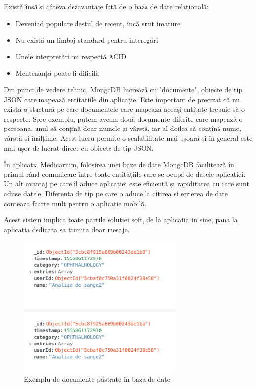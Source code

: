 \documentclass[12pt]{article}
\begin{document}
Există însă și câteva dezavantaje față de o baza de date relațională:
\begin{itemize}
    \item Devenind populare destul de recent, încă sunt imature
    \item Nu există un limbaj standard pentru interogări
    \item Unele interpretări nu respectă ACID
    \item Mentenanță poate fi dificilă
\end{itemize}


Din punct de vedere tehnic, MongoDB lucrează cu "documente", obiecte de tip JSON care 
mapează entitatiile din aplicație. Este important de precizat că nu există o stuctură
pe care documentele care mapează aceași entitate trebuie să o respecte. Spre exemplu, putem aveam
două documente diferite care mapează o persoana, unul să conțînă doar numele și vârstă, iar al doilea să conțînă
nume, vârstă și înălțime. Acest lucru permite o scalabilitate mai ușoară și în general este mai
ușor de lucrat direct cu obiecte de tip JSON.

\bigskip

În aplicația Medicarium, folosirea unei baze de date MongoDB facilitează în primul rând comunicare
între toate entitățiile care se ocupă de datele aplicației.
Un alt avantaj pe care îl aduce aplicației este eficientă și rapiditatea cu care sunt aduse datele.
Diferența de tip pe care o aduce la citirea si scrierea de date conteaza foarte mult pentru o aplicație mobilă.

Acest sistem implica toate partile solutiei soft, de la aplicatia in sine, pana la
aplicatia dedicata sa trimita doar mesaje.

\begin{figure}[H]
\centering
\includegraphics[height=7cm]{exmongo.png}
\caption{Exemplu de documente păstrate în baza de date}
\end{figure}
\end{document}
